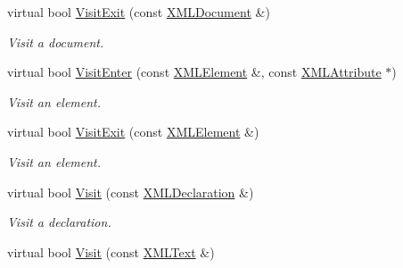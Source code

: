 \begin{DoxyCompactItemize}
\mbox{\label{classtinyxml2_1_1XMLVisitor_a170e9989cd046ba904f302d087e07086}} 
virtual bool \hyperlink{classtinyxml2_1_1XMLVisitor_a170e9989cd046ba904f302d087e07086}{Visit\+Exit} (const \hyperlink{classtinyxml2_1_1XMLDocument}{X\+M\+L\+Document} \&)
\begin{DoxyCompactList}\small\item\em Visit a document. \end{DoxyCompactList}\item 
\mbox{\label{classtinyxml2_1_1XMLVisitor_af97980a17dd4e37448b181f5ddfa92b5}} 
virtual bool \hyperlink{classtinyxml2_1_1XMLVisitor_af97980a17dd4e37448b181f5ddfa92b5}{Visit\+Enter} (const \hyperlink{classtinyxml2_1_1XMLElement}{X\+M\+L\+Element} \&, const \hyperlink{classtinyxml2_1_1XMLAttribute}{X\+M\+L\+Attribute} $\ast$)
\begin{DoxyCompactList}\small\item\em Visit an element. \end{DoxyCompactList}\item 
\mbox{\label{classtinyxml2_1_1XMLVisitor_a772f10ddc83f881956d32628faa16eb6}} 
virtual bool \hyperlink{classtinyxml2_1_1XMLVisitor_a772f10ddc83f881956d32628faa16eb6}{Visit\+Exit} (const \hyperlink{classtinyxml2_1_1XMLElement}{X\+M\+L\+Element} \&)
\begin{DoxyCompactList}\small\item\em Visit an element. \end{DoxyCompactList}\item 
\mbox{\label{classtinyxml2_1_1XMLVisitor_adc75bd459fc7ba8223b50f0616767f9a}} 
virtual bool \hyperlink{classtinyxml2_1_1XMLVisitor_adc75bd459fc7ba8223b50f0616767f9a}{Visit} (const \hyperlink{classtinyxml2_1_1XMLDeclaration}{X\+M\+L\+Declaration} \&)
\begin{DoxyCompactList}\small\item\em Visit a declaration. \end{DoxyCompactList}\item 
\mbox{\label{classtinyxml2_1_1XMLVisitor_af30233565856480ea48b6fa0d6dec65b}} 
virtual bool \hyperlink{classtinyxml2_1_1XMLVisitor_af30233565856480ea48b6fa0d6dec65b}{Visit} (const \hyperlink{classtinyxml2_1_1XMLText}{X\+M\+L\+Text} \&)

\end{DoxyCompactItemize}

